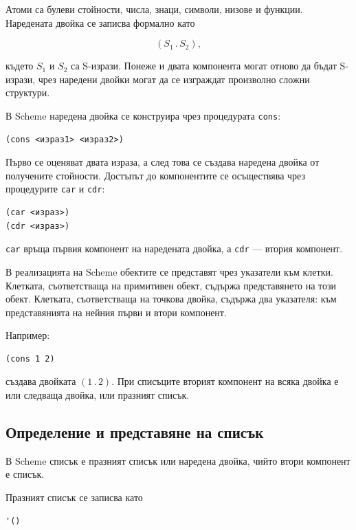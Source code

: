 Атоми са булеви стойности, числа, знаци, символи, низове и функции. Наредената двойка се записва формално като

\[
(S_1 \mathbin{.} S_2),
\]

където $S_1$ и $S_2$ са S-изрази. Понеже и двата компонента могат отново да бъдат S-изрази, чрез наредени двойки могат да се изграждат произволно сложни структури.

В Scheme наредена двойка се конструира чрез процедурата \texttt{cons}:

\begin{verbatim}
(cons <израз1> <израз2>)
\end{verbatim}

Първо се оценяват двата израза, а след това се създава наредена двойка от получените стойности. Достъпът до компонентите се осъществява чрез процедурите \texttt{car} и \texttt{cdr}:

\begin{verbatim}
(car <израз>)
(cdr <израз>)
\end{verbatim}

\texttt{car} връща първия компонент на наредената двойка, а \texttt{cdr} --- втория компонент.

В реализацията на Scheme обектите се представят чрез указатели към клетки. Клетката, съответстваща на примитивен обект, съдържа представянето на този обект. Клетката, съответстваща на точкова двойка, съдържа два указателя: към представянията на нейния първи и втори компонент.

Например:

\begin{verbatim}
(cons 1 2)
\end{verbatim}

създава двойката $(1 \mathbin{.} 2)$. При списъците вторият компонент на всяка двойка е или следваща двойка, или празният списък.

\subsection{Определение и представяне на списък}\label{s:20.2.2}

\begin{defn}
В Scheme списък е празният списък или наредена двойка, чийто втори компонент е списък.
\end{defn}

Празният списък се записва като

\begin{verbatim}
'()
\end{verbatim}

